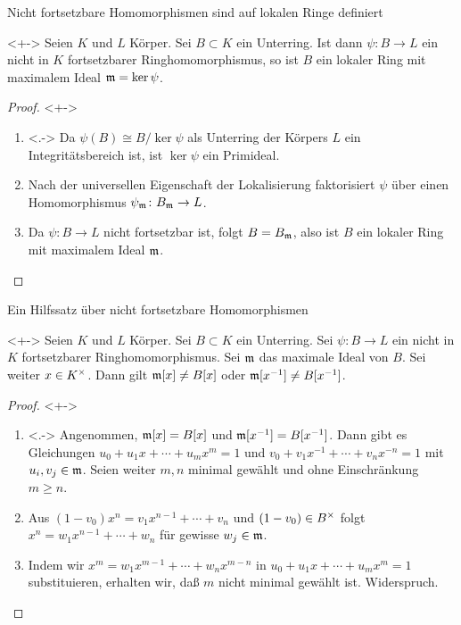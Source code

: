 \begin{frame}{Nicht fortsetzbare Homomorphismen sind auf lokalen Ringe definiert}
	\begin{lemma}<+->
		Seien \(K\) und \(L\) Körper. Sei \(B
		\subset K\) ein	Unterring. Ist dann \(\psi\colon B \to L\) ein nicht
		in \(K\) fortsetzbarer Ringhomomorphismus, so ist \(B\) ein lokaler Ring mit
		maximalem Ideal \(\mathfrak{m} = \ker \psi\).
	\end{lemma}
	\begin{proof}<+->
		\begin{enumerate}[<+->]
		\item<.->
			Da \(\psi(B) \cong B/\ker \psi\) als Unterring der Körpers \(L\) ein
			Integritätsbereich ist, ist \(\ker \psi\) ein Primideal.
		\item
			Nach der universellen Eigenschaft der Lokalisierung faktorisiert
			\(\psi\) über einen Homomorphismus \(\psi_{\mathfrak{m}}\colon
			B_{\mathfrak{m}} \to L\).
		\item
			Da \(\psi\colon B \to L\) nicht fortsetzbar ist, folgt
			\(B = B_{\mathfrak{m}}\), also ist \(B\) ein lokaler Ring mit maximalem
			Ideal \(\mathfrak{m}\).
			\qedhere
		\end{enumerate}
	\end{proof}
\end{frame}

\begin{frame}{Ein Hilfssatz über nicht fortsetzbare Homomorphismen}
	\begin{lemma}<+->
		Seien \(K\) und \(L\)
		Körper. Sei \(B \subset K\) ein Unterring.
		Sei \(\psi\colon B \to L\) ein nicht in \(K\) fortsetzbarer Ringhomomorphismus.
		Sei \(\mathfrak{m}\) das maximale Ideal von \(B\). Sei weiter
		\(x \in K^\times\). Dann gilt
		\(\mathfrak{m}[x] \neq B[x]\) oder \(\mathfrak{m}[x^{-1}] \neq B[x^{-1}]\).
	\end{lemma}
	\begin{proof}<+->
		\begin{enumerate}[<+->]
		\item<.->
			Angenommen, \(\mathfrak{m}[x] = B[x]\) und \(\mathfrak{m}[x^{-1}]
			= B[x^{-1}]\). Dann gibt es Gleichungen
			\(u_0 + u_1 x + \dotsb + u_m x^m = 1\) und
			\(v_0 + v_1 x^{-1} + \dotsb + v_n x^{-n} = 1\) mit \(u_i, v_j \in
			\mathfrak{m}\). Seien weiter \(m, n\) minimal gewählt und ohne
			Einschränkung \(m \ge n\).
		\item
			Aus \((1 - v_0) x^n = v_1 x^{n - 1} + \dotsb + v_n\) und
			\((1 - v_0) \in B^\times\) folgt
			\(x^n = w_1 x^{n - 1} + \dotsb + w_n\)
			für gewisse \(w_j \in \mathfrak{m}\).
		\item
			Indem wir \(x^m = w_1 x^{m - 1} + \dotsb + w_n x^{m - n}\) in
			\(u_0 + u_1 x + \dotsb + u_m x^m = 1\) substituieren, erhalten wir,
			daß \(m\) nicht minimal gewählt ist. Widerspruch.
			\qedhere
		\end{enumerate}
	\end{proof}
\end{frame}

